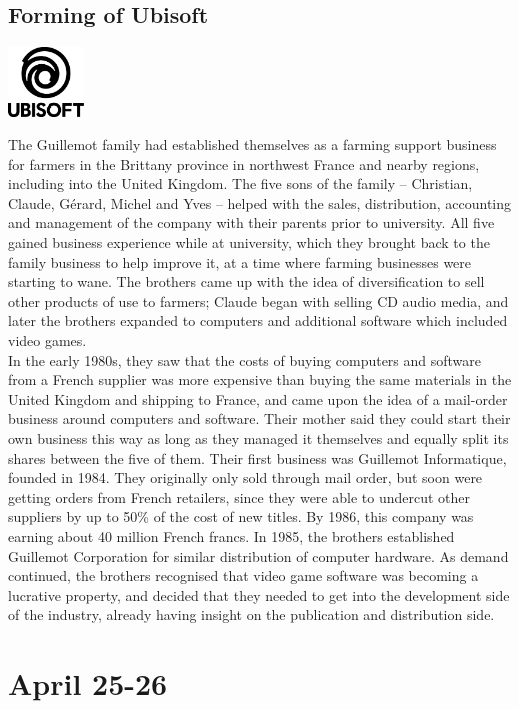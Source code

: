 \documentclass[11pt]{report}
\begin{document}
\subsection{Forming of Ubisoft}
\vspace{2mm}\begin{center}\includegraphics[width=2cm]{./img/ubisoftLogo.jpg}\end{center}
The Guillemot family had established themselves as a farming support business for farmers in the Brittany province in northwest France and nearby regions, including into the United Kingdom. The five sons of the family – Christian, Claude, Gérard, Michel and Yves – helped with the sales, distribution, accounting and management of the company with their parents prior to university. All five gained business experience while at university, which they brought back to the family business to help improve it, at a time where farming businesses were starting to wane. The brothers came up with the idea of diversification to sell other products of use to farmers; Claude began with selling CD audio media, and later the brothers expanded to computers and additional software which included video games.\\ \indent In the early 1980s, they saw that the costs of buying computers and software from a French supplier was more expensive than buying the same materials in the United Kingdom and shipping to France, and came upon the idea of a mail-order business around computers and software. Their mother said they could start their own business this way as long as they managed it themselves and equally split its shares between the five of them. Their first business was Guillemot Informatique, founded in 1984. They originally only sold through mail order, but soon were getting orders from French retailers, since they were able to undercut other suppliers by up to 50\% of the cost of new titles. By 1986, this company was earning about 40 million French francs. In 1985, the brothers established Guillemot Corporation for similar distribution of computer hardware. As demand continued, the brothers recognised that video game software was becoming a lucrative property, and decided that they needed to get into the development side of the industry, already having insight on the publication and distribution side.
\section{April 25-26}
\end{document}
